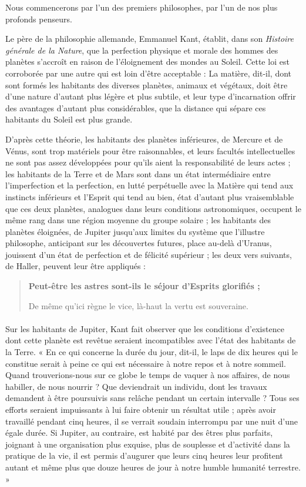 \documentclass[a4paper, 11pt, oneside, landscape]{article}
\begin{document}
Nous commencerons par l'un des premiers philosophes, par l'un de nos plus profonds penseurs.

Le père de la philosophie allemande, Emmanuel Kant, établit, dans son \emph{Histoire générale de la Nature}, que la perfection physique et morale des hommes des planètes s'accroît en raison de l'éloignement des mondes au Soleil. Cette loi est corroborée par une autre qui est loin d'être acceptable : La matière, dit-il, dont sont formés les habitants des diverses planètes, animaux et végétaux, doit être d'une nature d'autant plus légère et plus subtile, et leur type d'incarnation offrir des avantages d'autant plus considérables, que la distance qui sépare ces habitants du Soleil est plus grande.

D'après cette théorie, les habitants des planètes inférieures, de Mercure et de Vénus, sont trop matériels pour être raisonnables, et leurs facultés intellectuelles ne sont pas assez développées pour qu'ils aient la responsabilité de leurs actes ; les habitants de la Terre et de Mars sont dans un état intermédiaire entre l'imperfection et la perfection, en lutté perpétuelle avec la Matière qui tend aux instincts inférieurs et l'Esprit qui tend au bien, état d'autant plus vraisemblable que ces deux planètes, analogues dans leurs conditions astronomiques, occupent le même rang dans une région moyenne du groupe solaire ; les habitants des planètes éloignées, de Jupiter jusqu'aux limites du système que l'illustre philosophe, anticipant sur les découvertes futures, place au-delà d'Uranus, jouissent d'un état de perfection et de félicité supérieur ; les deux vers suivants, de Haller, peuvent leur être appliqués :
\begin{quotation}\bfseries\small
Peut-être les astres sont-ils le séjour d'Esprits glorifiés ;

De même qu'ici règne le vice, là-haut la vertu est souveraine.
\end{quotation}
\paragraph{}
Sur les habitants de Jupiter, Kant fait observer que les conditions d'existence dont cette planète est revêtue seraient incompatibles avec l'état des habitants de la Terre. « En ce qui concerne la durée du jour, dit-il, le laps de dix heures qui le constitue serait à peine ce qui est nécessaire à notre repos et à notre sommeil. Quand trouverions-nous sur ce globe le temps de vaquer à nos affaires, de nous habiller, de nous nourrir ? Que deviendrait un individu, dont les travaux demandent à être poursuivis sans relâche pendant un certain intervalle ? Tous ses efforts seraient impuissants à lui faire obtenir un résultat utile ; après avoir travaillé pendant cinq heures, il se verrait soudain interrompu par une nuit d'une égale durée. Si Jupiter, au contraire, est habité par des êtres plus parfaits, joignant à une organisation plus exquise, plus de souplesse et d'activité dans la pratique de la vie, il est permis d'augurer que leurs cinq heures leur profitent autant et même plus que douze heures de jour à notre humble humanité terrestre. »
\end{document}
